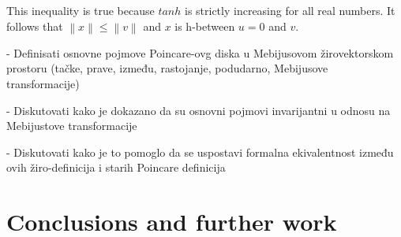 \documentclass[a4paper]{article}
\theoremstyle{definition}
\newcommand{\norm}[1]{\left\lVert#1\right\rVert}
\begin{document}
This inequality is true because $tanh$ is strictly increasing for all real numbers. It follows that $\norm{x} \leq \norm{v}$ and $x$ is h-between $u=0$ and $v$.


- Definisati osnovne pojmove Poincare-ovg diska u Mebijusovom žirovektorskom prostoru (tačke, prave, između, rastojanje, podudarno, Mebijusove transformacije)

- Diskutovati kako je dokazano da su osnovni pojmovi invarijantni u odnosu na Mebijustove transformacije

- Diskutovati kako je to pomoglo da se uspostavi formalna ekivalentnost između ovih žiro-definicija i starih Poincare definicija

\section{Conclusions and further work}\label{sec:conclusions}


\end{document}
